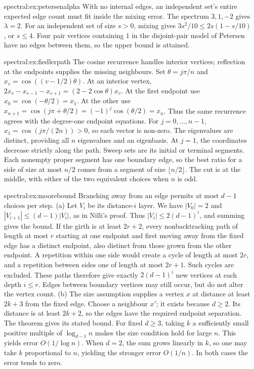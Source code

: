 \begin{solution}{spectral:ex:petersenalpha}
\idea With no internal edges, an independent set's entire expected edge count must fit inside the mixing error.
\writeup The spectrum $3,1,-2$ gives $\lambda=2$. For an independent set of size $s>0$, mixing gives $3s^2/10\le2s(1-s/10)$, or $s\le4$. Four pair vertices containing $1$ in the disjoint-pair model of Petersen have no edges between them, so the upper bound is attained.
\end{solution}
\begin{solution}{spectral:ex:fiedlerpath}
\idea The cosine recurrence handles interior vertices; reflection at the endpoints supplies the missing neighbours.
\writeup Set $\theta=j\pi/n$ and $x_v=\cos((v-1/2)\theta)$. At an interior vertex,
$2x_v-x_{v-1}-x_{v+1}=(2-2\cos\theta)x_v$.
At the first endpoint use $x_0=\cos(-\theta/2)=x_1$. At the other use $x_{n+1}=\cos(j\pi+\theta/2)=(-1)^j\cos(\theta/2)=x_n$. Thus the same recurrence agrees with the degree-one endpoint equations. For $j=0,\ldots,n-1$, $x_1=\cos(j\pi/(2n))>0$, so each vector is non-zero. The eigenvalues are distinct, providing all $n$ eigenvalues and an eigenbasis.
At $j=1$, the coordinates decrease strictly along the path. Sweep sets are its initial or terminal segments. Each nonempty proper segment has one boundary edge, so the best ratio for a side of size at most $n/2$ comes from a segment of size $\lfloor n/2\rfloor$. The cut is at the middle, with either of the two equivalent choices when $n$ is odd.
\end{solution}
\begin{solution}{spectral:ex:moorebound}
\idea Branching away from an edge permits at most $d-1$ choices per step.
\writeup (a) Let $V_i$ be its distance-$i$ layer. We have $|V_0|=2$ and $|V_{i+1}|\le(d-1)|V_i|$, as in Nilli's proof. Thus $|V_i|\le2(d-1)^i$, and summing gives the bound. If the girth is at least $2r+2$, every nonbacktracking path of length at most $r$ starting at one endpoint and first moving away from the fixed edge has a distinct endpoint, also distinct from those grown from the other endpoint. A repetition within one side would create a cycle of length at most $2r$, and a repetition between sides one of length at most $2r+1$. Such cycles are excluded. These paths therefore give exactly $2(d-1)^i$ new vertices at each depth $i\le r$. Edges between boundary vertices may still occur, but do not alter the vertex count.
(b) The size assumption supplies a vertex $x$ at distance at least $2k+3$ from the fixed edge. Choose a neighbour $x'$; it exists because $d\ge2$. Its distance is at least $2k+2$, so the edges have the required endpoint separation. The theorem gives its stated bound.
For fixed $d\ge3$, taking $k$ a sufficiently small positive multiple of $\log_{d-1}n$ makes the size condition hold for large $n$. This yields error $O(1/\log n)$. When $d=2$, the sum grows linearly in $k$, so one may take $k$ proportional to $n$, yielding the stronger error $O(1/n)$. In both cases the error tends to zero.
\end{solution}

